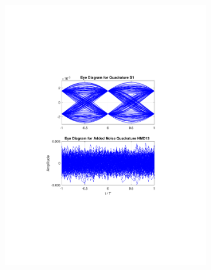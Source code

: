 \begin{refsection}
\begin{figure}[H]
\begin{minipage}{\linewidth}
\begin{subfigure}{.45\textwidth}
	\end{subfigure}
	\begin{subfigure}{.45\textwidth}
		\centering
		\includegraphics[clip, trim=5cm 7cm 5cm 7cm, width=\textwidth]{./sdf/m_qam_system/figures/eyes/q_n_nmf_60_60_rc_03.pdf}
	\end{subfigure}
	

\end{minipage}
\end{figure}
\end{refsection}
